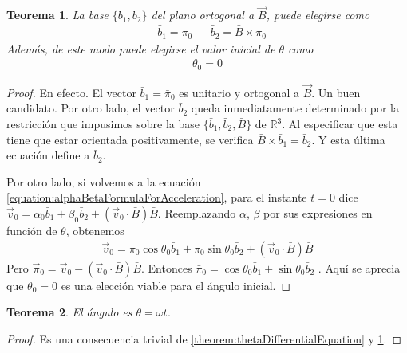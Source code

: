 \documentclass{article}
\newcommand{\realNumbers}{\mathbb{R}}
\newtheorem{theorem}{Teorema}
\begin{document}
  \begin{theorem}
    \label{theorem:constantsThatDefineTheSolution_b1b2theta0}
    La base \(\{\bar{b}_1, \bar{b}_2\}\) del plano ortogonal a \(\vec{B}\), puede elegirse como
    \begin{align}
      \label{equation:basisVectorsb1b2}
      &\bar{b}_1
      =
      \bar{\pi}_0
      &
      &\bar{b}_2
      =
      \bar{B}
      \times
      \bar{\pi}_0
    \end{align}
    Además, de este modo puede elegirse el valor inicial de \(\theta\) como 
    \begin{align}
      \theta_0 = 0
    \end{align}
  \end{theorem}
  \begin{proof}
    En efecto.
    El vector \(\bar{b}_1 = \bar{\pi}_0\) es unitario y ortogonal a \(\vec{B}\).
    Un buen candidato.
    Por otro lado, el vector \(\bar{b}_2\) queda inmediatamente determinado por la restricción que impusimos sobre la base \(\{\bar{b}_1, \bar{b}_2, \bar{B}\}\) de \(\realNumbers^3\).
    Al especificar que esta tiene que estar orientada positivamente, se verifica \(\bar{B} \times \bar{b}_1 = \bar{b}_2\).
    Y esta última ecuación define a \(\bar{b}_2\).

    Por otro lado, si volvemos a la ecuación \eqref{equation:alphaBetaFormulaForAcceleration}, para el instante \(t = 0\) dice
    \(\vec{v}_0 = \alpha_0 \bar{b}_1 + \beta_0 \bar{b}_2 + (\vec{v}_0 \cdot \bar{B}) \bar{B}\).
    Reemplazando \(\alpha\), \(\beta\) por sus expresiones en función de \(\theta\), obtenemos
    \begin{align}
      \vec{v}_0
      =
      \pi_0 \cos \theta_0 \bar{b}_1
      + \pi_0 \sin \theta_0 \bar{b}_2
      + (\vec{v}_0 \cdot \bar{B}) \bar{B}
    \end{align}
    Pero \(\vec{\pi}_0 = \vec{v}_0 - (\vec{v}_0 \cdot \bar{B}) \bar{B}\).
    Entonces
    \(
      \bar{\pi}_0
      =
      \cos \theta_0 \bar{b}_1
      + \sin \theta_0 \bar{b}_2
    \)
    .
    Aquí se aprecia que \(\theta_0 = 0\) es una elección viable para el ángulo inicial.
  \end{proof}

  \begin{theorem}
    \label{theorem:thetaSolution}
    El ángulo es \(\theta = \omega t\).
  \end{theorem}
  \begin{proof}
    Es una consecuencia trivial de \ref{theorem:thetaDifferentialEquation} y \ref{theorem:constantsThatDefineTheSolution_b1b2theta0}.
  \end{proof}
\end{document}
